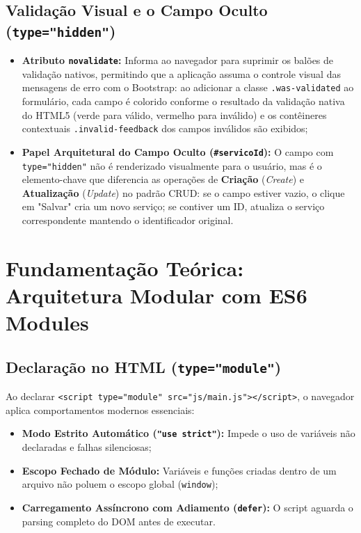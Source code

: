 \subsection{Validação Visual e o Campo Oculto (\texttt{type="hidden"})}
\begin{itemize}
  \item \textbf{Atributo \texttt{novalidate}:} Informa ao navegador para suprimir os balões de validação nativos, permitindo que a aplicação assuma o controle visual das mensagens de erro com o Bootstrap: ao adicionar a classe \texttt{.was-validated} ao formulário, cada campo é colorido conforme o resultado da validação nativa do HTML5 (verde para válido, vermelho para inválido) e os contêineres contextuais \texttt{.invalid-feedback} dos campos inválidos são exibidos;
  \item \textbf{Papel Arquitetural do Campo Oculto (\texttt{\#servicoId}):} O campo com \texttt{type="hidden"} não é renderizado visualmente para o usuário, mas é o elemento-chave que diferencia as operações de \textbf{Criação} (\textit{Create}) e \textbf{Atualização} (\textit{Update}) no padrão CRUD: se o campo estiver vazio, o clique em "Salvar" cria um novo serviço; se contiver um ID, atualiza o serviço correspondente mantendo o identificador original.
\end{itemize}


\section{Fundamentação Teórica: Arquitetura Modular com ES6 Modules}\label{sec:m2a}

\subsection{Declaração no HTML (\texttt{type="module"})}
Ao declarar \texttt{<script type="module" src="js/main.js"></script>}, o navegador aplica comportamentos modernos essenciais:
\begin{itemize}
  \item \textbf{Modo Estrito Automático (\texttt{"use strict"}):} Impede o uso de variáveis não declaradas e falhas silenciosas;
  \item \textbf{Escopo Fechado de Módulo:} Variáveis e funções criadas dentro de um arquivo não poluem o escopo global (\texttt{window});
  \item \textbf{Carregamento Assíncrono com Adiamento (\texttt{defer}):} O script aguarda o parsing completo do DOM antes de executar.
\end{itemize}

